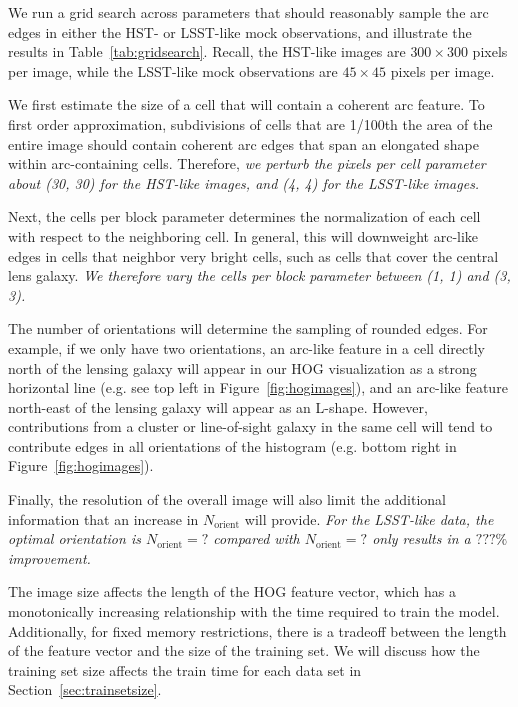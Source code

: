\documentclass{emulateapj}
\newcommand{\wording}[1]{{\it\color{purple} #1}}
\begin{document}
We run a grid search across parameters that should reasonably sample
the arc edges in either the HST- or LSST-like mock observations, and
illustrate the results in Table~\ref{tab:gridsearch}.  Recall, the
HST-like images are $300\times300$ pixels per image, while the
LSST-like mock observations are $45\times45$ pixels per image.

We first estimate the size of a cell that will contain a coherent arc
feature.  To first order approximation, subdivisions of cells that are
1/100th the area of the entire image should contain coherent arc edges
that span an elongated shape within arc-containing cells.  Therefore,
\wording{we perturb the pixels per cell parameter about (30, 30) for
  the HST-like images, and (4, 4) for the LSST-like images.}

Next, the cells per block parameter determines the normalization of
each cell with respect to the neighboring cell.  In general, this will
downweight arc-like edges in cells that neighbor very bright cells,
such as cells that cover the central lens galaxy.  \wording{We therefore
  vary the cells per block parameter between (1, 1) and (3, 3).}

The number of orientations will determine the sampling of rounded
edges.  For example, if we only have two orientations, an arc-like
feature in a cell directly north of the lensing galaxy will appear in
our HOG visualization as a strong horizontal line (e.g. see top left
in Figure~\ref{fig:hogimages}), and an arc-like feature north-east of
the lensing galaxy will appear as an L-shape.  However, contributions
from a cluster or line-of-sight galaxy in the same cell will tend to
contribute edges in all orientations of the histogram (e.g. bottom
right in Figure~\ref{fig:hogimages}).  

Finally, the resolution of the overall image will also limit the
additional information that an increase in $N_\text{orient}$ will
provide.  \wording{For the LSST-like data, the optimal orientation is
  $N_\text{orient}=?$ compared with $N_\text{orient}=?$ only results
  in a $???\%$ improvement.}

The image size affects the length of the HOG feature vector, which has
a monotonically increasing relationship with the time required to
train the model.  Additionally, for fixed memory restrictions, there
is a tradeoff between the length of the feature vector and the size of
the training set.  We will discuss how the training set size affects
the train time for each data set in Section~\ref{sec:trainsetsize}.
\end{document}
